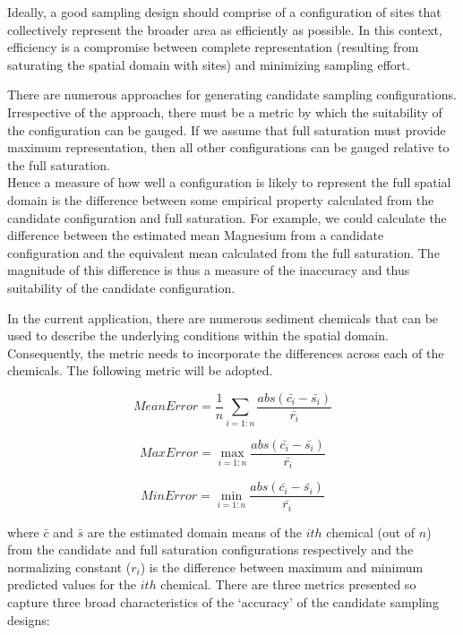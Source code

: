 \documentclass[a4paper]{article}
\begin{document}
Ideally, a good sampling design should comprise of a configuration of
sites that collectively represent the broader area as efficiently as
possible. In this context, efficiency is a compromise between complete
representation (resulting from saturating the spatial domain with sites)
and minimizing sampling effort.

There are numerous approaches for generating candidate sampling
configurations. Irrespective of the approach, there must be a metric by
which the suitability of the configuration can be gauged. If we assume
that full saturation must provide maximum representation, then all other
configurations can be gauged relative to the full saturation.\\
Hence a measure of how well a configuration is likely to represent the
full spatial domain is the difference between some empirical property
calculated from the candidate configuration and full saturation. For
example, we could calculate the difference between the estimated mean
Magnesium from a candidate configuration and the equivalent mean
calculated from the full saturation. The magnitude of this difference is
thus a measure of the inaccuracy and thus suitability of the candidate
configuration.

In the current application, there are numerous sediment chemicals that
can be used to describe the underlying conditions within the spatial
domain. Consequently, the metric needs to incorporate the differences
across each of the chemicals. The following metric will be adopted.

\[
Mean Error = \frac{1}{n} \sum_{i=1:n}{\frac{abs(\bar{c_i} - \bar{s_i})}{\bar{r_i}}}
\]

\[
Max Error = \max_{i=1:n}{\frac{abs(\bar{c_i} - \bar{s_i})}{\bar{r_i}}}
\]

\[
Min Error = \min_{i=1:n}{\frac{abs(\bar{c_i} - \bar{s_i})}{\bar{r_i}}}
\]

where \(\bar{c}\) and \(\bar{s}\) are the estimated domain means of the
\(ith\) chemical (out of \(n\)) from the candidate and full saturation
configurations respectively and the normalizing constant (\(r_i\)) is
the difference between maximum and minimum predicted values for the
\(ith\) chemical. There are three metrics presented so capture three
broad characteristics of the `accuracy' of the candidate sampling
designs:
\end{document}
